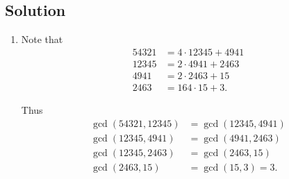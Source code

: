 \documentclass{article}
\begin{document}
\subsection*{Solution}
    \begin{enumerate}
        \item
        \begin{minipage}[t]{0.4\textwidth}
        Note that
        \begin{align*}
            54321 &= 4 \cdot 12345 + 4941  \\
            12345 &= 2 \cdot 4941 + 2463 \\
            4941 &= 2 \cdot 2463 + 15 \\
            2463 &= 164 \cdot 15 + 3.
        \end{align*}
        \end{minipage}
        \begin{minipage}[t]{0.4\textwidth}
        Thus
        \begin{align*}
            \gcd(54321, 12345) &= \gcd(12345, 4941) \\
            \gcd(12345, 4941) &= \gcd(4941, 2463) \\
            \gcd(12345, 2463) &= \gcd(2463, 15) \\
            \gcd(2463, 15) &= \gcd(15, 3) = 3.
        \end{align*}
        \end{minipage}
        

\end{enumerate}
\end{document}
